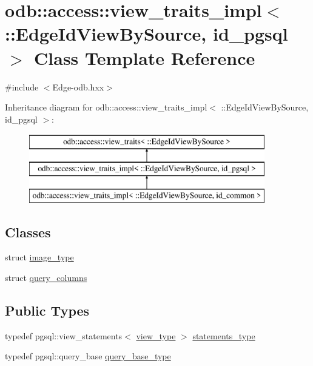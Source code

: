 \hypertarget{classodb_1_1access_1_1view__traits__impl_3_01_1_1_edge_id_view_by_source_00_01id__pgsql_01_4}{}\section{odb\+:\+:access\+:\+:view\+\_\+traits\+\_\+impl$<$ \+:\+:Edge\+Id\+View\+By\+Source, id\+\_\+pgsql $>$ Class Template Reference}
\label{classodb_1_1access_1_1view__traits__impl_3_01_1_1_edge_id_view_by_source_00_01id__pgsql_01_4}


{\ttfamily \#include $<$Edge-\/odb.\+hxx$>$}

Inheritance diagram for odb\+:\+:access\+:\+:view\+\_\+traits\+\_\+impl$<$ \+:\+:Edge\+Id\+View\+By\+Source, id\+\_\+pgsql $>$\+:\begin{figure}[H]
\begin{center}
\leavevmode
\includegraphics[height=3.000000cm]{db/d04/classodb_1_1access_1_1view__traits__impl_3_01_1_1_edge_id_view_by_source_00_01id__pgsql_01_4}
\end{center}
\end{figure}
\subsection*{Classes}
\begin{DoxyCompactItemize}
\item 
struct \hyperlink{structodb_1_1access_1_1view__traits__impl_3_01_1_1_edge_id_view_by_source_00_01id__pgsql_01_4_1_1image__type}{image\+\_\+type}
\item 
struct \hyperlink{structodb_1_1access_1_1view__traits__impl_3_01_1_1_edge_id_view_by_source_00_01id__pgsql_01_4_1_1query__columns}{query\+\_\+columns}
\end{DoxyCompactItemize}
\subsection*{Public Types}
\begin{DoxyCompactItemize}
\item 
typedef pgsql\+::view\+\_\+statements$<$ \hyperlink{classodb_1_1access_1_1view__traits_3_01_1_1_edge_id_view_by_source_01_4_a59c0e6416446c0356c1d4b5be32c1239}{view\+\_\+type} $>$ \hyperlink{classodb_1_1access_1_1view__traits__impl_3_01_1_1_edge_id_view_by_source_00_01id__pgsql_01_4_a40f7425535527f4913ad949024d370fc}{statements\+\_\+type}
\item 
typedef pgsql\+::query\+\_\+base \hyperlink{classodb_1_1access_1_1view__traits__impl_3_01_1_1_edge_id_view_by_source_00_01id__pgsql_01_4_a1268e0d4560bb9ddbc67863974201f52}{query\+\_\+base\+\_\+type}
\end{DoxyCompactItemize}
